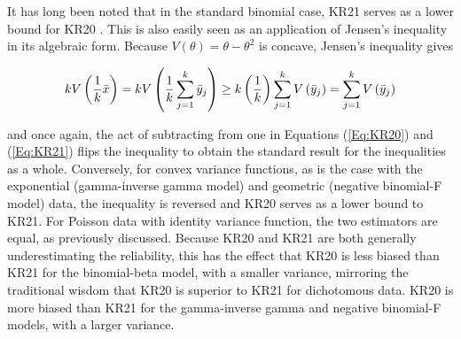 \documentclass[12pt,epsfig]{article}
\newcommand{\changed}[1]{\textcolor{black}{#1}}
\newcommand{\numsubjects}{\changed{n}}%
\newcommand{\testlength}{\changed{k}}%
\begin{document}
It has long been noted that in the standard binomial case, KR21 serves as a lower bound for KR20 \citep{Kuder1937}. This is also easily seen as an application of Jensen's inequality in its algebraic form. Because $V(\theta) = \theta - \theta^2$ is concave, Jensen's inequality gives

\begin{equation*}
\testlength V\left( \frac{1}{\testlength} \bar{x}\right) = \testlength V\left(\frac{1}{\testlength} \sum_{j = 1}^{\testlength} \bar{y}_j\right) \ge \testlength \left(\frac{1}{\testlength} \right)\sum_{j = 1}^{\testlength}  V\left(\bar{y}_j\right) = \sum_{j = 1}^{\testlength}  V\left(\bar{y}_j\right)
\end{equation*}

\noindent and once again, the act of subtracting from one in Equations (\ref{Eq:KR20}) and (\ref{Eq:KR21}) flips the inequality to obtain the standard result for the inequalities as a whole. Conversely, for convex variance functions, as is the case with the exponential (gamma-inverse gamma model) and geometric (negative binomial-F model) data, the inequality is reversed and KR20 serves as a lower bound to KR21. For Poisson data with identity variance function, the two estimators are equal, as previously discussed. Because KR20 and KR21 are both generally underestimating the reliability, this has the effect that KR20 is less biased than KR21 for the binomial-beta model, with a smaller variance, mirroring the traditional wisdom that KR20 is superior to KR21 for dichotomous data. KR20 is more biased than KR21 for the gamma-inverse gamma and negative binomial-F models, with a larger variance.



\end{document}
